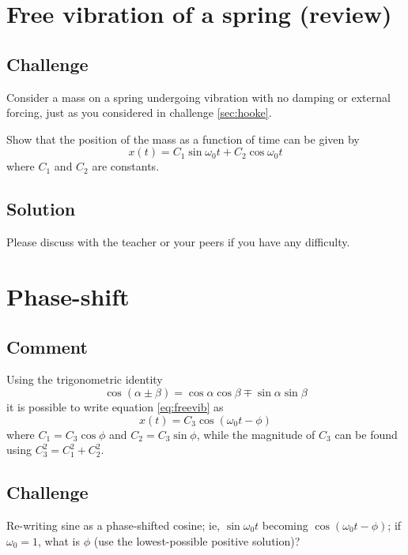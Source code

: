 \section{Free vibration of a spring (review)}

\subsection*{Challenge}
Consider a mass on a spring undergoing vibration with no damping or external forcing, just as you considered in challenge \ref{sec:hooke}.

Show that the position of the mass as a function of time can be given by
\begin{equation}
    \label{eq:freevib}
    x(t) = C_1 \sin \omega_0 t + C_2 \cos \omega_0 t
\end{equation}
where $C_1$ and $C_2$ are constants. 

\subsection*{Solution}
Please discuss with the teacher or your peers if you have any difficulty.




\newpage
\section{Phase-shift}

\subsection*{Comment}
Using the trigonometric identity
\begin{equation}
    \cos(\alpha \pm \beta) = \cos \alpha \cos \beta \mp \sin \alpha \sin \beta
\end{equation}
it is possible to write equation \ref{eq:freevib} as
\begin{equation}
    x(t) = C_3 \cos(\omega_0 t - \phi)
\end{equation}
where $C_1 = C_3 \cos \phi$ and $C_2 = C_3 \sin \phi$, while the magnitude of $C_3$ can be found using $C_3^2 = C_1^2 + C_2^2$.

\subsection*{Challenge}
Re-writing sine as a phase-shifted cosine; ie, $\sin \omega_0 t$ becoming $\cos (\omega_0 t - \phi)$; if $\omega_0 = 1$, what is $\phi$ (use the lowest-possible positive solution)?

